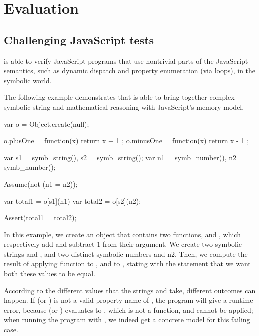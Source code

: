 

\section{Evaluation}

\subsection{Challenging JavaScript tests}

\cosette is able to verify JavaScript programs that use nontrivial parts of the JavaScript semantics, such as dynamic dispatch and property enumeration (via  loops), in the symbolic world.

The following example demonstrates that \cosette is able to bring together complex symbolic string and mathematical reasoning with JavaScript's memory model.

\begin{lstjs}
var o = Object.create(null);

o.plusOne = function(x) { return x + 1 };
o.minusOne = function(x) { return x - 1 };

var s1 = symb_string(), s2 = symb_string();
var n1 = symb_number(), n2 = symb_number();

Assume(not (n1 = n2));

var total1 = o[s1](n1)
var total2 = o[s2](n2);

Assert(total1 = total2);
\end{lstjs}

In this example, we create an object  that contains two functions,  and , which respectively add and subtract $1$ from their argument.
We create two symbolic strings  and , and two distinct symbolic numbers  and {n2}.
Then, we compute the result of applying function  to , and  to , stating with the  statement that we want both these values to be equal.

According to the different values that the strings  and  take,  different outcomes can happen.
If  (or ) is not a valid property name of , the program will give a runtime error, because  (or ) evaluates to , which is not a function, and cannot be applied; when running the program with \cosette, we indeed get a concrete model for this failing case.

